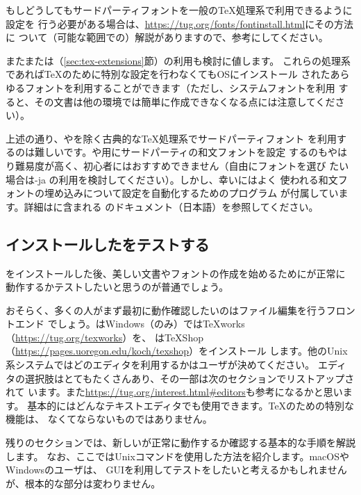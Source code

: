 \documentclass[uplatex,dvipdfmx,12pt,tombow]{jsarticle}
\begin{document}
もしどうしてもサードパーティフォントを一般の\TeX 処理系で利用できるように設定を
行う必要がある場合は、\url{https://tug.org/fonts/fontinstall.html}にその方法に
ついて（可能な範囲での）解説がありますので、参考にしてください。

また\XeTeX または\LuaTeX （\ref{sec:tex-extensions}節）の利用も検討に値します。
これらの処理系であれば\TeX のために特別な設定を行わなくてもOSにインストール
されたあらゆるフォントを利用することができます（ただし、システムフォントを利用
すると、その文書は他の環境では簡単に作成できなくなる点には注意してください）。

\begin{janote}
上述の通り、\XeTeX や\LuaTeX を除く古典的な\TeX 処理系でサードパーティフォント
を利用するのは難しいです。\pTeX や\upTeX 用にサードパーティの和文フォントを設定
するのもやはり難易度が高く、初心者にはおすすめできません（自由にフォントを選び
たい場合は\LuaTeX-ja の利用を検討してください）。しかし、幸い\TL にはよく
使われる和文フォントの埋め込みについて設定を自動化するためのプログラム
が付属しています。詳細は\TL に含まれる
のドキュメント（日本語）を参照してください。
\end{janote}

\subsection{インストールした\TL をテストする}
\label{sec:test-install}

\TL をインストールした後、美しい文書やフォントの作成を始めるために\TL が正常に
動作するかテストしたいと思うのが普通でしょう。

おそらく、多くの人がまず最初に動作確認したいのはファイル編集を行うフロントエンド
でしょう。\TL はWindows（のみ）では{\TeX}works（\url{https://tug.org/texworks}）を、
\MacTeX は{\TeX}Shop（\url{https://pages.uoregon.edu/koch/texshop}）をインストール
します。他のUnix系システムではどのエディタを利用するかはユーザが決めてください。
エディタの選択肢はとてもたくさんあり、その一部は次のセクションでリストアップされて
います。また\url{https://tug.org/interest.html#editors}も参考になるかと思います。
基本的にはどんなテキストエディタでも使用できます。\TeX のための特別な機能は、
なくてならないものではありません。

残りのセクションでは、新しい\TL が正常に動作するか確認する基本的な手順を解説します。
なお、ここではUnixコマンドを使用した方法を紹介します。macOSやWindowsのユーザは、
GUIを利用してテストをしたいと考えるかもしれませんが、根本的な部分は変わりません。
\end{document}
